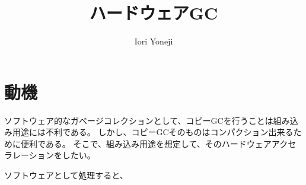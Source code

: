 \documentclass{article}
\title{ハードウェアGC}
\author{Iori Yoneji}
\begin{document}
\maketitle
\section{動機}
ソフトウェア的なガベージコレクションとして、コピーGCを行うことは組み込み用途には不利である。
しかし、コピーGCそのものはコンパクション出来るために便利である。
そこで、組み込み用途を想定して、そのハードウェアアクセラレーションをしたい。

ソフトウェアとして処理すると、
\end{document}
